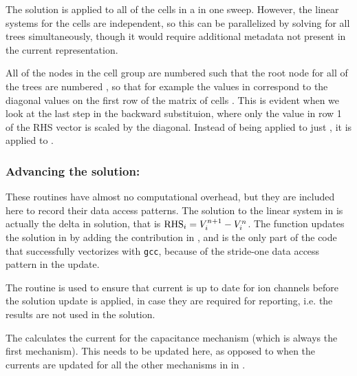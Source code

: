 \begin{note}
The solution is applied to all of the cells in a  in one sweep.
However, the linear systems for the cells are independent, so this can be parallelized by solving for all trees simultaneously, though it would require additional metadata not present in the current  representation.

All of the nodes in the cell group are numbered such that the root node for all of the trees are numbered , so that for example the values in  correspond to the diagonal values on the first row of the matrix of cells .
This is evident when we look at the last step in the backward substituion, where only the value in row 1 of the RHS vector is scaled by the diagonal.
Instead of being applied to just , it is applied to .
\end{note}


\subsubsection{Advancing the solution: }
These routines have almost no computational overhead, but they are included here to record their data access patterns.
The solution to the linear system in  is actually the delta in solution, that is ${\text{RHS}}_{i} = {V}_{i}^{n+1} - {V}_{i}^{n}$.
The  function updates the solution in  by adding the contribution in ,
and is the only part of the \neuron code that successfully vectorizes with \texttt{gcc}, because of the stride-one data access pattern in the update.

The  routine is used to ensure that current is up to date for ion channels before the solution update is applied, in case they are required for reporting, i.e. the results are not used in the solution.

The  calculates the current for the capacitance mechanism (which is always the first mechanism). This needs to be updated here, as opposed to when the currents are updated for all the other mechanisms in  in .

